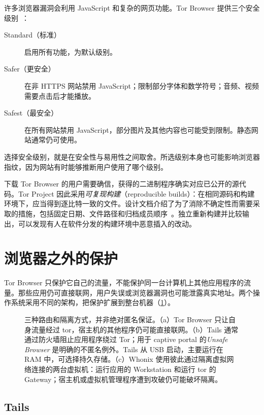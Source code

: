 许多浏览器漏洞会利用 JavaScript 和复杂的网页功能。Tor Browser 提供三个安全级别~\cite{tbmanual}：
\begin{description}
  \item[Standard（标准）] 启用所有功能，为默认级别。
  \item[Safer（更安全）] 在非 HTTPS 网站禁用 JavaScript；限制部分字体和数学符号；音频、视频需要点击后才能播放。
  \item[Safest（最安全）] 在所有网站禁用 JavaScript，部分图片及其他内容也可能受到限制。静态网站通常仍可使用。
\end{description}
选择安全级别，就是在安全性与易用性之间取舍。所选级别本身也可能影响浏览器指纹，因为网站有时能够推断用户使用了哪个级别。

\begin{approfondimento}[可复现构建]
下载 Tor Browser 的用户需要确信，获得的二进制程序确实对应已公开的源代码。Tor Project 因此采用\emph{可复现构建}（reproducible builds）：在相同源码和构建环境下，应当得到逐比特一致的文件。设计文档介绍了为了消除不确定性而需要采取的措施，包括固定日期、文件路径和归档成员顺序~\cite{perry2018torbrowser}。独立重新构建并比较输出，可以发现有人在软件分发的构建环境中恶意插入的改动。
\end{approfondimento}

\section{浏览器之外的保护}\label{sec:browser-sistemi}

Tor Browser 只保护它自己的流量，不能保护同一台计算机上其他应用程序的流量。那些应用仍可直接联网，用户失误或浏览器漏洞也可能泄露真实地址。两个操作系统采用不同的架构，把保护扩展到整台机器（\cref{fig:architetture}）。

\begin{figure}[htbp]
\centering

\caption{三种路由和隔离方式，并非绝对匿名保证。（a）Tor Browser 只让自身流量经过 tor，宿主机的其他程序仍可能直接联网。（b）Tails 通常通过防火墙阻止应用程序绕过 Tor；用于 captive portal 的\emph{Unsafe Browser} 是明确的不匿名例外。Tails 从 USB 启动，主要运行在 RAM 中，可选择持久存储。（c）Whonix 使用彼此通过隔离虚拟网络连接的两台虚拟机：运行应用的 Workstation 和运行 tor 的 Gateway；宿主机或虚拟机管理程序遭到攻破仍可能破坏隔离。}
\label{fig:architetture}
\end{figure}

\subsection{Tails}

